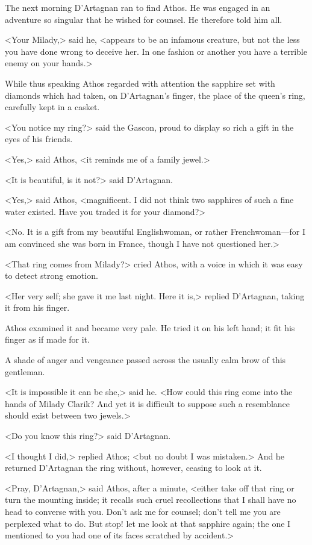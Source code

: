 The next morning D'Artagnan ran to find Athos. He was engaged in an adventure so singular that he wished for counsel. He therefore told him all. 

<Your Milady,> said he, <appears to be an infamous creature, but not the less you have done wrong to deceive her. In one fashion or another you have a terrible enemy on your hands.> 

While thus speaking Athos regarded with attention the sapphire set with diamonds which had taken, on D'Artagnan's finger, the place of the queen's ring, carefully kept in a casket. 

<You notice my ring?> said the Gascon, proud to display so rich a gift in the eyes of his friends. 

<Yes,> said Athos, <it reminds me of a family jewel.> 

<It is beautiful, is it not?> said D'Artagnan. 

<Yes,> said Athos, <magnificent. I did not think two sapphires of such a fine water existed. Have you traded it for your diamond?> 

<No. It is a gift from my beautiful Englishwoman, or rather Frenchwoman—for I am convinced she was born in France, though I have not questioned her.> 

<That ring comes from Milady?> cried Athos, with a voice in which it was easy to detect strong emotion. 

<Her very self; she gave it me last night. Here it is,> replied D'Artagnan, taking it from his finger. 

Athos examined it and became very pale. He tried it on his left hand; it fit his finger as if made for it. 

A shade of anger and vengeance passed across the usually calm brow of this gentleman. 

<It is impossible it can be she,> said he. <How could this ring come into the hands of Milady Clarik? And yet it is difficult to suppose such a resemblance should exist between two jewels.> 

<Do you know this ring?> said D'Artagnan. 

<I thought I did,> replied Athos; <but no doubt I was mistaken.> And he returned D'Artagnan the ring without, however, ceasing to look at it. 

<Pray, D'Artagnan,> said Athos, after a minute, <either take off that ring or turn the mounting inside; it recalls such cruel recollections that I shall have no head to converse with you. Don't ask me for counsel; don't tell me you are perplexed what to do. But stop! let me look at that sapphire again; the one I mentioned to you had one of its faces scratched by accident.> 

